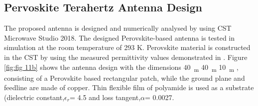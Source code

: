 \documentclass[12pt]{suhbook}
\begin{document}
\subsection{Pervoskite Terahertz Antenna Design}
The proposed antenna is designed and numerically analysed by using CST Microwave Studio \si{2018}. The designed Perovskite-based antenna is tested in simulation at the room temperature of 293 K. Perovskite material is constructed in the CST by using the measured permittivity values demonstrated in \cite{green2014emergence}. Figure \ref{fig:fig 11b} shows the antenna design with the dimensions \SI{40}{\mu_m} \times \SI{40}{\mu_m} \times \SI{10}{\mu_m} , consisting of a Perovskite based rectangular patch, while the ground plane and feedline are made of copper. Thin flexible film of polyamide is used as a substrate (dielectric constant,$ \epsilon_r $= 4.5 and loss tangent,$\alpha $= 0.0027.
\end{document}

